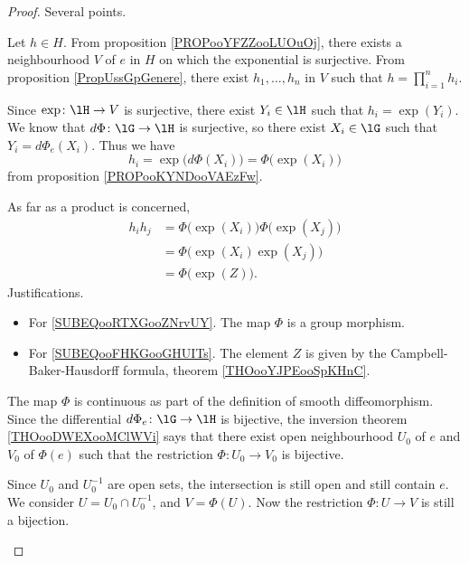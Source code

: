 \begin{proof}
	Several points.
	\begin{subproof}
		Let \( h\in H\). From proposition \ref{PROPooYFZZooLUOuOj}, there exists a neighbourhood \( V\) of \( e\) in \( H\) on which the exponential is surjective. From proposition \ref{PropUssGpGenere}, there exist \( h_1,\ldots, h_n\) in \( V\) such that \( h=\prod_{i=1}^nh_i\).

		Since \( \exp\colon \lH\to V\) is surjective, there exist \( Y_i\in \lH\) such that \( h_i=\exp(Y_i)\). We know that \( d\Phi\colon \lG\to \lH\) is surjective, so there exist \( X_i\in\lG\) such that \( Y_i=d\Phi_e(X_i)\). Thus we have
		\begin{equation}
			h_i=\exp\big( d\Phi(X_i) \big)=\Phi\big( \exp(X_i) \big)
		\end{equation}
		from proposition \ref{PROPooKYNDooVAEzFw}.

		As far as a product is concerned,
		\begin{subequations}
			\begin{align}
				h_ih_j & =\Phi\big( \exp(X_i) \big)\Phi\big( \exp(X_j) \big)                \\
				       & =\Phi\big( \exp(X_i)\exp(X_j) \big)    \label{SUBEQooRTXGooZNrvUY} \\
				       & =\Phi\big( \exp(Z) \big).      \label{SUBEQooFHKGooGHUITs}
			\end{align}
		\end{subequations}
		Justifications.
		\begin{itemize}
			\item For \eqref{SUBEQooRTXGooZNrvUY}. The map \( \Phi\) is a group morphism.
			\item For \eqref{SUBEQooFHKGooGHUITs}. The element \( Z\) is given by the Campbell-Baker-Hausdorff formula, theorem \ref{THOooYJPEooSpKHnC}.
		\end{itemize}
		\spitem[Continuous]
		The map \( \Phi\) is continuous as part of the definition of smooth diffeomorphism.
		Since the differential \( d\Phi_e\colon \lG\to \lH\) is bijective, the inversion theorem \ref{THOooDWEXooMClWVi} says that there exist open neighbourhood \( U_0\) of \( e\) and \( V_0\) of \( \Phi(e)\) such that  the restriction \( \Phi\colon U_0\to V_0\) is bijective.

		Since \( U_0\) and \( U_0^{-1}\) are open sets, the intersection is still open and still contain \( e\). We consider \( U=U_0\cap U_0^{-1}\), and \( V=\Phi(U)\). Now the restriction \( \Phi\colon U\to V\) is still a bijection.


\end{subproof}
\end{proof}
